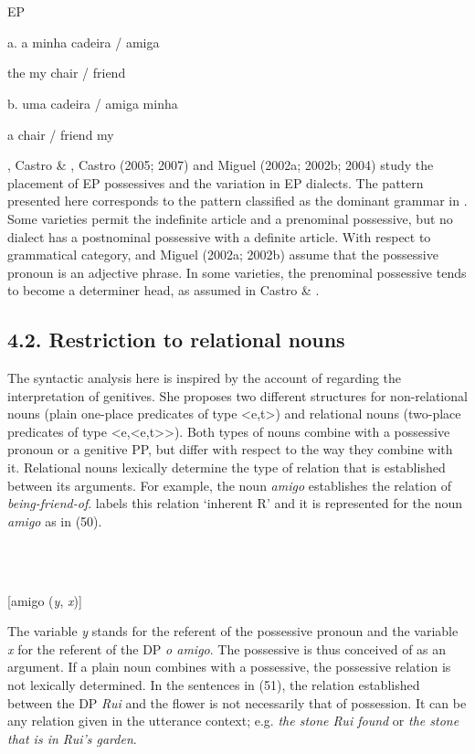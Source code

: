 \documentclass[output=paper]{langsci/langscibook}
\begin{document}
\ea%
    \label{ex:key:49}
    \gll\\
        \\
    \glt
    \z

          EP

  a.  a minha cadeira / amiga

the my chair / friend

  b.  uma cadeira / amiga minha

a chair / friend my

\citet{Brito2007}, Castro \& \citet{Costa2003}, Castro (2005; 2007) and Miguel (2002a; 2002b; 2004) study the placement of EP possessives and the variation in EP dialects. The pattern presented here corresponds to the pattern classified as the dominant grammar in \citet{Brito2007}. Some varieties permit the indefinite article and a prenominal possessive, but no dialect has a postnominal possessive with a definite article. With respect to grammatical category, \citet{Brito2007} and Miguel (2002a; 2002b) assume that the possessive pronoun is an adjective phrase. In some varieties, the prenominal possessive tends to become a determiner head, as assumed in Castro \& \citet{Costa2003}.

\subsection{ 4.2. Restriction to relational nouns} 

The syntactic analysis here is inspired by the account of \citet{Partee1997} regarding the interpretation of genitives. She proposes two different structures for non-relational nouns (plain one-place predicates of type <e,t>) and relational nouns (two-place predicates of type <e,<e,t>>). Both types of nouns combine with a possessive pronoun or a genitive PP, but differ with respect to the way they combine with it. Relational nouns lexically determine the type of relation that is established between its arguments. For example, the noun \textit{amigo} establishes the relation of \textit{being-friend-of}. \citet{Partee1997} labels this relation ‘inherent R’ and it is represented for the noun \textit{amigo} as in (50).

\ea%
    \label{ex:key:50}
    \gll\\
        \\
    \glt
    \z

          [amigo (\textit{y}, \textit{x})]

The variable \textit{y} stands for the referent of the possessive pronoun and the variable \textit{x} for the referent of the DP \textit{o amigo}. The possessive is thus conceived of as an argument. If a plain noun combines with a possessive, the possessive relation is not lexically determined. In the sentences in (51), the relation established between the DP \textit{Rui} and the flower is not necessarily that of possession. It can be any relation given in the utterance context; e.g. \textit{the stone Rui found} or \textit{the stone that is in Rui’s garden}.
\end{document}
